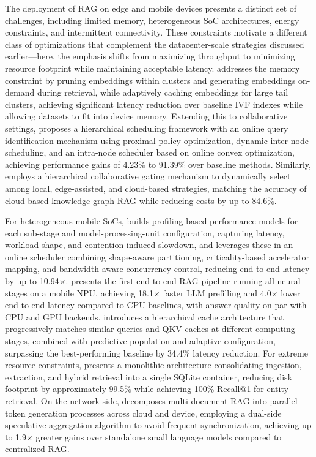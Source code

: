 \documentclass[11pt]{article}
\begin{document}
The deployment of RAG on edge and mobile devices presents a distinct set of challenges, including limited memory, heterogeneous SoC architectures, energy constraints, and intermittent connectivity. These constraints motivate a different class of optimizations that complement the datacenter-scale strategies discussed earlier---here, the emphasis shifts from maximizing throughput to minimizing resource footprint while maintaining acceptable latency. \cite{ref544} addresses the memory constraint by pruning embeddings within clusters and generating embeddings on-demand during retrieval, while adaptively caching embeddings for large tail clusters, achieving significant latency reduction over baseline IVF indexes while allowing datasets to fit into device memory. Extending this to collaborative settings, \cite{ref545} proposes a hierarchical scheduling framework with an online query identification mechanism using proximal policy optimization, dynamic inter-node scheduling, and an intra-node scheduler based on online convex optimization, achieving performance gains of 4.23\% to 91.39\% over baseline methods. Similarly, \cite{ref546} employs a hierarchical collaborative gating mechanism to dynamically select among local, edge-assisted, and cloud-based strategies, matching the accuracy of cloud-based knowledge graph RAG while reducing costs by up to 84.6\%.

For heterogeneous mobile SoCs, \cite{ref547} builds profiling-based performance models for each sub-stage and model-processing-unit configuration, capturing latency, workload shape, and contention-induced slowdown, and leverages these in an online scheduler combining shape-aware partitioning, criticality-based accelerator mapping, and bandwidth-aware concurrency control, reducing end-to-end latency by up to 10.94×. \cite{ref548} presents the first end-to-end RAG pipeline running all neural stages on a mobile NPU, achieving 18.1× faster LLM prefilling and 4.0× lower end-to-end latency compared to CPU baselines, with answer quality on par with CPU and GPU backends. \cite{ref522} introduces a hierarchical cache architecture that progressively matches similar queries and QKV caches at different computing stages, combined with predictive population and adaptive configuration, surpassing the best-performing baseline by 34.4\% latency reduction. For extreme resource constraints, \cite{ref549} presents a monolithic architecture consolidating ingestion, extraction, and hybrid retrieval into a single SQLite container, reducing disk footprint by approximately 99.5\% while achieving 100\% Recall@1 for entity retrieval. On the network side, \cite{ref550} decomposes multi-document RAG into parallel token generation processes across cloud and device, employing a dual-side speculative aggregation algorithm to avoid frequent synchronization, achieving up to 1.9× greater gains over standalone small language models compared to centralized RAG.
\end{document}
